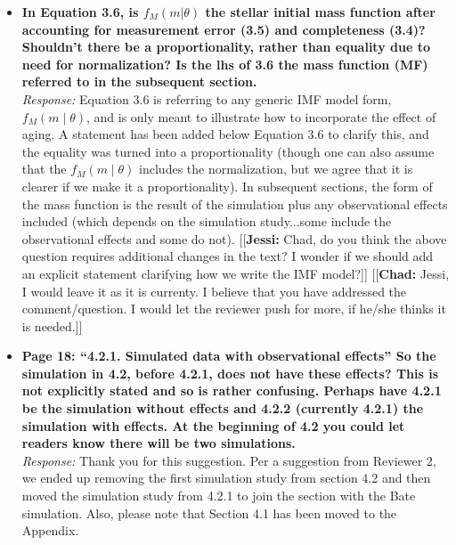 \documentclass[11pt, oneside]{article}   	%
\newcommand{\jessi}[1]{{\color{blue}[[\textbf{Jessi: }#1]]}}
\newcommand{\chad}[1]{{\color{cyan}[[\textbf{Chad: }#1]]}}
\begin{document}
\begin{itemize}
\item {\bf In Equation 3.6, is $f_M (m|\theta)$ the stellar initial mass function after accounting for measurement error (3.5) and completeness (3.4)? Shouldn't there be a proportionality, rather than equality due to need for normalization? Is the lhs of 3.6 the mass function (MF) referred to in the subsequent section.} \\
\noindent \emph{Response:}  Equation 3.6 is referring to any generic IMF model form, $f_M(m \mid \theta)$, and is only meant to illustrate how to incorporate the effect of aging.  A statement has been added below Equation 3.6 to clarify this, and the equality was turned into a proportionality (though one can also assume that the $f_M(m \mid \theta)$ includes the normalization, but we agree that it is clearer if we make it a proportionality).  In subsequent sections, the form of the mass function is the result of the simulation plus any observational effects included (which depends on the simulation study...some include the observational effects and some do not).  
\jessi{Chad, do you think the above question requires additional changes in the text?  I wonder if we should add an explicit statement clarifying how we write the IMF model?}
\chad{Jessi, I would leave it as it is currenty. I believe that you have addressed the comment/question. I would let the reviewer push for more, if he/she thinks it is needed.}
\bigskip

\item {\bf Page 18: ``4.2.1. Simulated data with observational effects'' So the simulation in 4.2, before 4.2.1, does not have these effects? This is not explicitly stated and so is rather confusing. Perhaps have 4.2.1 be the simulation without effects and 4.2.2 (currently 4.2.1) the simulation with effects. At the beginning of 4.2 you could let readers know there will be two simulations. }\\
\noindent \emph{Response:} Thank you for this suggestion.  Per a suggestion from Reviewer 2, we ended up removing the first simulation study from section 4.2 and then moved the simulation study from 4.2.1 to join the section with the Bate simulation.  Also, please note that Section 4.1 has been moved to the Appendix.
\bigskip


\end{itemize}
\end{document}
